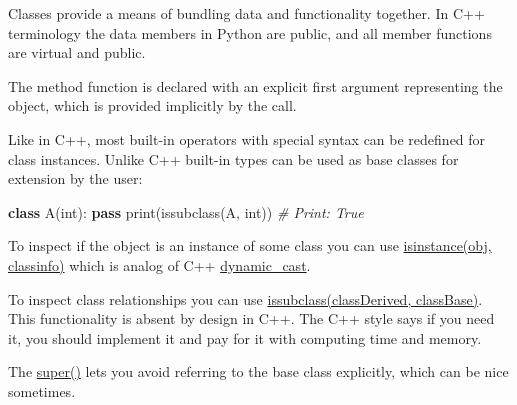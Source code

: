 \documentclass[
]{article}
\newenvironment{Shaded}{}{}
\newcommand{\BuiltInTok}[1]{#1}
\newcommand{\CommentTok}[1]{\textcolor[rgb]{0.38,0.63,0.69}{\textit{#1}}}
\newcommand{\ControlFlowTok}[1]{\textcolor[rgb]{0.00,0.44,0.13}{\textbf{#1}}}
\newcommand{\KeywordTok}[1]{\textcolor[rgb]{0.00,0.44,0.13}{\textbf{#1}}}
\newcommand{\NormalTok}[1]{#1}
\begin{document}
Classes provide a means of bundling data and functionality together. In
C++ terminology the data members in Python are public, and all member
functions are virtual and public.

The method function is declared with an explicit first argument
representing the object, which is provided implicitly by the call.

Like in C++, most built-in operators with special syntax can be
redefined for class instances. Unlike C++ built-in types can be used as
base classes for extension by the user:

\begin{Shaded}
\begin{Highlighting}[]
\KeywordTok{class}\NormalTok{ A(}\BuiltInTok{int}\NormalTok{): }\ControlFlowTok{pass}
\BuiltInTok{print}\NormalTok{(}\BuiltInTok{issubclass}\NormalTok{(A, }\BuiltInTok{int}\NormalTok{))}
\CommentTok{\# Print: True}
\end{Highlighting}
\end{Shaded}

To inspect if the object is an instance of some class you can use
\href{https://docs.python.org/3/library/functions.html\#isinstance}{isinstance(obj,
classinfo)} which is analog of C++
\href{https://en.cppreference.com/w/cpp/language/dynamic_cast}{dynamic\_cast}.

To inspect class relationships you can use
\href{https://docs.python.org/3/library/functions.html\#issubclass}{issubclass(classDerived,
classBase)}. This functionality is absent by design in C++. The C++
style says if you need it, you should implement it and pay for it with
computing time and memory.

The
\href{https://docs.python.org/3/library/functions.html\#super}{super()}
lets you avoid referring to the base class explicitly, which can be nice
sometimes.
\end{document}
